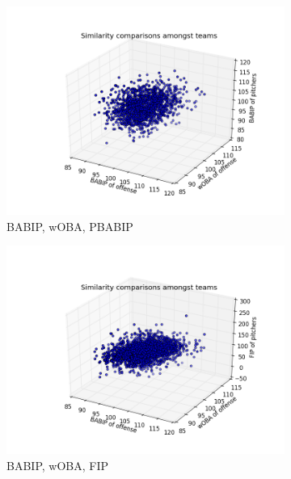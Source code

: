 \documentclass[12pt]{article}
\numberwithin{equation}{subsection}
\begin{document}
\begin{figure}[H] 
\centering

  \begin{subfigure}[b]{0.33\linewidth}
    \centering
    \includegraphics[width=0.9\linewidth]{Sim1} 
    \caption{BABIP, wOBA, PBABIP} 
    \label{fig5:a} 
    \vspace{4ex}
  \end{subfigure}%
  \begin{subfigure}[b]{0.33\linewidth}
    \centering
    \includegraphics[width=0.9\linewidth]{Sim2} 
    \caption{BABIP, wOBA, FIP} 
    \label{fig5:b} 
    \vspace{4ex}
  \end{subfigure} 
  \begin{subfigure}[b]{0.33\linewidth}
    \centering

\end{subfigure}
\end{figure}
\end{document}

